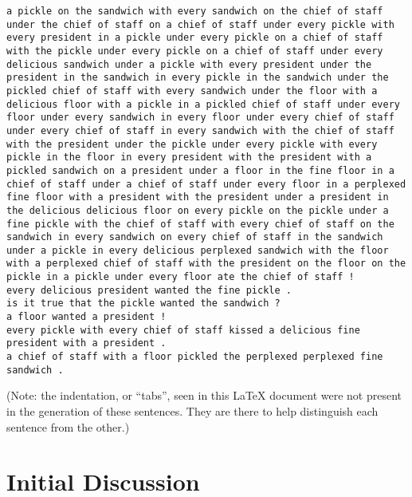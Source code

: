 \documentclass[11pt]{article}
\begin{document}
\begin{lstlisting}
a pickle on the sandwich with every sandwich on the chief of staff under the chief of staff on a chief of staff under every pickle with every president in a pickle under every pickle on a chief of staff with the pickle under every pickle on a chief of staff under every delicious sandwich under a pickle with every president under the president in the sandwich in every pickle in the sandwich under the pickled chief of staff with every sandwich under the floor with a delicious floor with a pickle in a pickled chief of staff under every floor under every sandwich in every floor under every chief of staff under every chief of staff in every sandwich with the chief of staff with the president under the pickle under every pickle with every pickle in the floor in every president with the president with a pickled sandwich on a president under a floor in the fine floor in a chief of staff under a chief of staff under every floor in a perplexed fine floor with a president with the president under a president in the delicious delicious floor on every pickle on the pickle under a fine pickle with the chief of staff with every chief of staff on the sandwich in every sandwich on every chief of staff in the sandwich under a pickle in every delicious perplexed sandwich with the floor with a perplexed chief of staff with the president on the floor on the pickle in a pickle under every floor ate the chief of staff !
every delicious president wanted the fine pickle .
is it true that the pickle wanted the sandwich ?
a floor wanted a president !
every pickle with every chief of staff kissed a delicious fine president with a president .
a chief of staff with a floor pickled the perplexed perplexed fine sandwich .
	\end{lstlisting}
(Note: the indentation, or ``tabs'', seen in this LaTeX document were not present in the generation of these sentences. They are there to help distinguish each sentence from the other.)
\newpage

\section{Initial Discussion}
\end{document}
